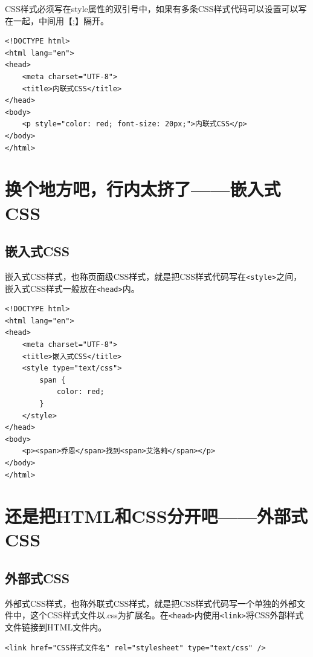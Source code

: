 CSS样式必须写在style属性的双引号中，如果有多条CSS样式代码可以设置可以写在一起，中间用【;】隔开。

\begin{lstlisting}[style=htmlcssjs, title=内联式CSS]
<!DOCTYPE html>
<html lang="en">
<head>
    <meta charset="UTF-8">
    <title>内联式CSS</title>
</head>
<body>
    <p style="color: red; font-size: 20px;">内联式CSS</p>
</body>
</html>
\end{lstlisting}

\newpage

\section{换个地方吧，行内太挤了——嵌入式CSS}

\subsection{嵌入式CSS}

嵌入式CSS样式，也称页面级CSS样式，就是把CSS样式代码写在\lstinline|<style>|之间，嵌入式CSS样式一般放在\lstinline|<head>|内。

\begin{lstlisting}[style=htmlcssjs, title=嵌入式CSS]
<!DOCTYPE html>
<html lang="en">
<head>
    <meta charset="UTF-8">
    <title>嵌入式CSS</title>
    <style type="text/css">
        span {
            color: red;
        }
    </style>
</head>
<body>
    <p><span>乔恩</span>找到<span>艾洛莉</span></p>
</body>
</html>
\end{lstlisting}

\newpage

\section{还是把HTML和CSS分开吧——外部式CSS}

\subsection{外部式CSS}

外部式CSS样式，也称外联式CSS样式，就是把CSS样式代码写一个单独的外部文件中，这个CSS样式文件以.css为扩展名。在\lstinline|<head>|内使用\lstinline|<link>|将CSS外部样式文件链接到HTML文件内。 \\

\begin{lstlisting}[style=htmlcssjs]
<link href="CSS样式文件名" rel="stylesheet" type="text/css" />
\end{lstlisting}

